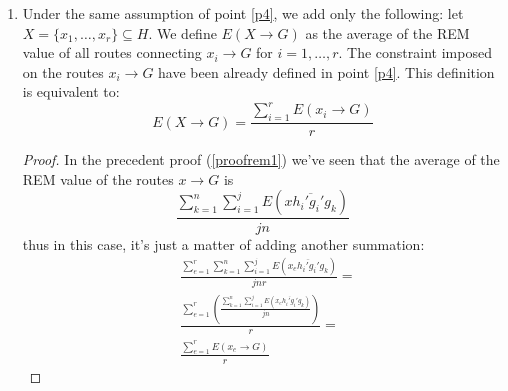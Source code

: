 \documentclass[a4paper]{article}
\begin{document}
\begin{enumerate}
\begin{proof}
			The arithmetic mean of their REM is:
			\[
			\frac{\sum_{k=1}^n \sum_{i=1}^j
			E(\overline{xh_i'g_i'g_k})}{jn}
			\]
			By the associative property of REM we can write:
			\[
			\frac{\sum_{k=1}^n \sum_{i=1}^j
			E(\overline{xh_i'g_i'})+E(\overline{g_i'g_k})}{jn}
			\]
			that is the same of:
			\begin{align*}
			\frac{n\sum_{i=1}^j E(\overline{xh_i'g_i'})+\sum_{k=1}^n \sum_{i=1}^j
			E(\overline{g_i'g_k})}{jn}=\\
			\frac{n\sum_{i=1}^j E(\overline{xh_i'g_i'})}{jn}+\frac{\sum_{k=1}^n \sum_{i=1}^j
                        E(\overline{g_i'g_k})}{jn}=\\
			\frac{\sum_{i=1}^j E(\overline{xh_i'g_i'})}{j}+\frac{\sum_{k=1}^n \sum_{i=1}^j
                        E(\overline{g_i'g_k})}{jn}
			\end{align*}
			The last identity is exactly what we were looking for:
			\begin{align*}
			E(x \rightarrow
			\{g_1',\dots,g_j'\})&=\frac{\sum_{i=1}^j
			E(\overline{xh_i'g_i'})}{j}\\
			E(\{g_1',\dots,g_j'\}\rightarrow
			G)&=\frac{\sum_{k=1}^n
			\sum_{i=1}^jE(\overline{g_i'g_k})}{jn}\\
			E(x\rightarrow G)&=
			E(x \rightarrow \{g_1',\dots,g_j'\}) +
			E(\{g_1',\dots,g_j'\}\rightarrow G)\\
			&= \frac{\sum_{i=1}^j
			E(\overline{xh_i'g_i'})}{j}+\frac{\sum_{k=1}^n
			\sum_{i=1}^jE(\overline{g_i'g_k})}{jn}
			\end{align*}
		\end{proof}
	\item Under the same assumption of point \ref{p4}, we add only the
		following: let $X=\{x_1,\dots,x_r\} \subseteq H$.
		We define $E(X\rightarrow G)$ as the average of the REM value
		of all routes connecting $x_i \rightarrow G$ for
		$i=1,\dots,r$. The constraint imposed on the routes
		$x_i \rightarrow G$ have been already defined in point
		\ref{p4}. This definition is equivalent to:
		\[
		E(X\rightarrow G) = \frac{\sum_{i=1}^rE(x_i\rightarrow G)}{r}
		\]
		\begin{proof}
			In the precedent proof (\ref{proofrem1}) we've seen
			that the average of the REM value of the routes $x\rightarrow G$ is
			\[
			\frac{\sum_{k=1}^n \sum_{i=1}^j
			E(\overline{xh_i'g_i'g_k})}{jn}
			\]
			thus in this case, it's just a matter of adding
			another summation:
			\begin{align*}
				& \frac{\sum_{e=1}^r \sum_{k=1}^n
				\sum_{i=1}^jE(\overline{x_eh_i'g_i'g_k})}{jnr}=\\
				&\frac{\sum_{e=1}^r\left(
				\frac{\sum_{k=1}^n \sum_{i=1}^j
				E(\overline{x_eh_i'g_i'g_k})}{jn}
				\right)}{r}=\\
				&\frac{\sum_{e=1}^rE(x_e\rightarrow G)}{r}
			\end{align*}
		\end{proof}
\end{enumerate}
\end{document}
